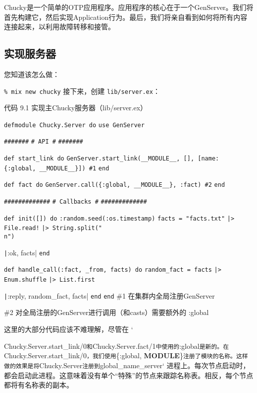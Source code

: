 Chucky是一个简单的OTP应用程序。应用程序的核心在于一个GenServer。我们将首先构建它，然后实现Application行为。最后，我们将亲自看到如何将所有内容连接起来，以利用故障转移和接管。

\subsection{实现服务器}

您知道该怎么做：

\texttt{\% mix new chucky} 接下来，创建
\texttt{lib/server.ex}：

代码 9.1 实现主Chucky服务器（lib/server.ex）

\texttt{defmodule Chucky.Server do}
\texttt{use GenServer}

\texttt{\#\#\#\#\#\#\#}
\texttt{\# API \#}
\texttt{\#\#\#\#\#\#\#}

\texttt{def start\_link do}
\texttt{GenServer.start\_link(\_\_MODULE\_\_, [], [name: \{:global, \_\_MODULE\_\_\}]) \#1}
\texttt{end}

\texttt{def fact do}
\texttt{GenServer.call(\{:global, \_\_MODULE\_\_\}, :fact)                        \#2}
\texttt{end}

\texttt{\#\#\#\#\#\#\#\#\#\#\#\#\#}
\texttt{\# Callbacks \#}
\texttt{\#\#\#\#\#\#\#\#\#\#\#\#\#}

\texttt{def init([]) do}
\texttt{:random.seed(:os.timestamp)}
\texttt{facts = "facts.txt"}
\texttt{|> File.read!}
\texttt{|> String.split("\\n")}

\texttt|{:ok, facts}| \texttt{end}

\texttt{def handle\_call(:fact, \_from, facts) do}
\texttt{random\_fact = facts}
\texttt{|> Enum.shuffle}
\texttt{|> List.first}

\texttt|{:reply, random_fact, facts}|
\texttt{end} \texttt{end} \#1
在集群内全局注册GenServer

\#2 对全局注册的GenServer进行调用（和casts）需要额外的 :global

这里的大部分代码应该不难理解，尽管在 `

Chucky.Server.start\_link/0\texttt{和}Chucky.Server.fact/1\texttt{中使用的}:global\texttt{是新的。在}Chucky.Server.start\_link/0\texttt{，我们使用}\{:global,
\textbf{MODULE}\}\texttt{注册了模块的名称。这样做的效果是将}Chucky.Server\texttt{注册到}global\_name\_server`
进程上。每次节点启动时，都会启动此进程。这意味着没有单个``特殊''的节点来跟踪名称表。相反，每个节点都将有名称表的副本。

